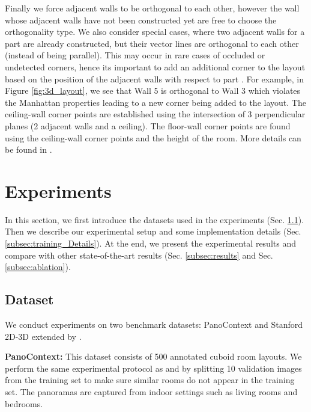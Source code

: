 \documentclass[final]{cvpr}
\begin{document}
Finally we force adjacent walls to be orthogonal to each other, however the wall whose adjacent walls have not been constructed yet are free to choose the orthogonality type. We also consider special cases, where two adjacent walls for a part  are already constructed, but their vector lines are orthogonal to each other (instead of being parallel). This may occur in rare cases of occluded or undetected corners, hence its important to add an additional corner to the layout based on the position of the adjacent walls with respect to part . For example, in Figure \ref{fig:3d_layout}, we see that Wall 5 is orthogonal to Wall 3 which violates the Manhattan properties leading to a new corner being added to the layout. The ceiling-wall corner points are established using the intersection of 3 perpendicular planes (2 adjacent walls and a ceiling). The floor-wall corner points are found using the ceiling-wall corner points and the height of the room. More details can be found in \cite{sun2019horizonnet}.



\section{Experiments}\label{sec:exp}




In this section, we first introduce the datasets used in the experiments (Sec. \ref{subsec:data}). Then we describe our experimental setup and some implementation details (Sec. \ref{subsec:training_Details}).
At the end, we present the experimental results and compare with other state-of-the-art results (Sec. \ref{subsec:results} and Sec. \ref{subsec:ablation}).


\subsection{Dataset}\label{subsec:data}
We conduct experiments on two benchmark datasets: PanoContext \cite{zhang2014panocontext} and Stanford 2D-3D \cite{armeni2017joint} extended by \cite{zou2018layoutnet}.

\textbf{PanoContext:} This dataset consists of 500 annotated cuboid room layouts. We perform the same experimental protocol as \cite{sun2019horizonnet} and \cite{zou2018layoutnet} by
splitting 10  validation images from the training set to make sure similar rooms do not appear in the training set. The panoramas are captured from indoor settings such as living rooms and bedrooms.
\end{document}
